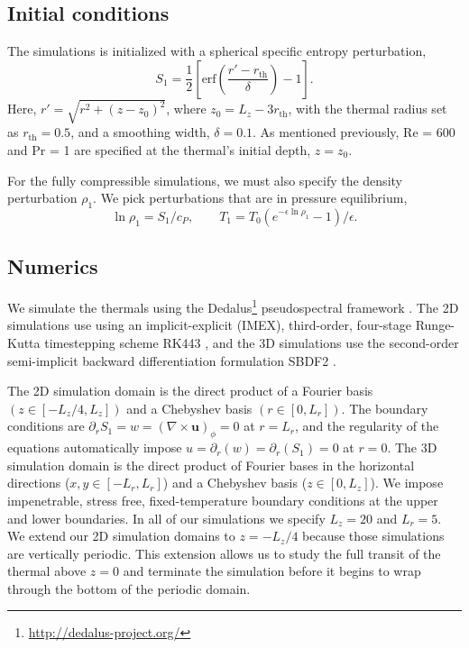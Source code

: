 \documentclass[twocolumn, amsmath, amsfonts, amssymb, trackchanges]{aastex62}
\newcommand{\grad}{\ensuremath{\nabla}}
\begin{document}
\subsection{Initial conditions}
The simulations is initialized with a spherical specific entropy perturbation,
\begin{equation}
S_1 = \frac{1}{2}\left[\text{erf}\left(\frac{r' - r_{\text{th}}}{\delta}\right) - 1\right].
\label{eqn:thermal_IC}
\end{equation}
Here, $r' = \sqrt{r^2 + (z - z_0)^2}$, where $z_0 = L_z - 3r_{\text{th}}$, with the thermal radius set as $r_{\text{th}} = 0.5$, and a smoothing width, $\delta = 0.1$.
As mentioned previously, Re = 600 and Pr = 1 are specified at the thermal's initial depth, $z = z_0$.

For the fully compressible simulations, we must also specify the density perturbation $\rho_1$.
We pick perturbations that are in pressure equilibrium,
\begin{equation}
\ln\rho_1 = S_1/c_P, \qquad T_1 = T_0(e^{-\epsilon\ln\rho_1} - 1)/\epsilon.
\end{equation}


\subsection{Numerics}
We simulate the thermals using the  Dedalus\footnote{\url{http://dedalus-project.org/}} pseudospectral framework \citep{burns&all2016, burns&all2019}.
The 2D simulations use using an implicit-explicit (IMEX), third-order, four-stage Runge-Kutta timestepping scheme RK443 \citep{ascher&all1997}, and the 3D simulations use the second-order semi-implicit backward differentiation formulation SBDF2 \citep{wang&ruuth2008}.

The 2D simulation domain is the direct product of a Fourier basis $(z \in [-L_z/4, L_z])$ and a Chebyshev basis $(r \in [0, L_r])$.
The boundary conditions are $\partial_r S_1 = w = (\grad\times\bm{u})_\phi = 0$ at $r = L_r$, and the regularity of the equations automatically impose $u = \partial_r(w) = \partial_r(S_1) = 0$ at $r = 0$.
The 3D simulation domain is the direct product of Fourier bases in the horizontal directions ($x, y \in [-L_r, L_r]$) and a Chebyshev basis ($z \in [0, L_z]$).
We impose impenetrable, stress free, fixed-temperature boundary conditions at the upper and lower boundaries.
In all of our simulations we specify $L_z = 20$ and $L_r = 5$.
We extend our 2D simulation domains to $z = -L_z/4$ because those simulations are vertically periodic.
This extension allows us to study the full transit of the thermal above $z = 0$ and terminate the simulation before it begins to wrap through the bottom of the periodic domain.
\end{document}
